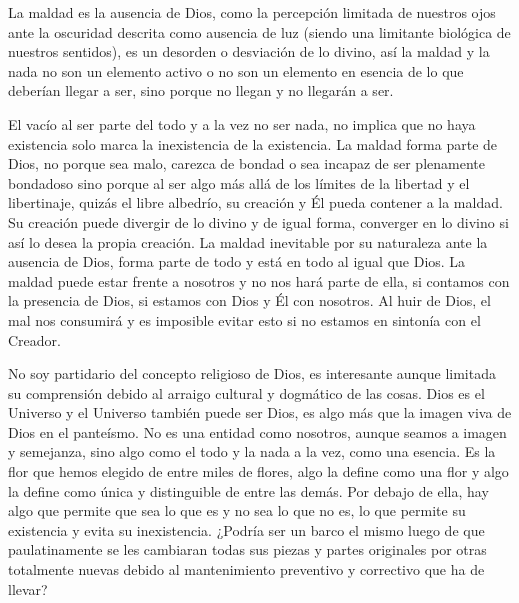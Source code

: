\documentclass[letterpaper,12pt]{article}
\begin{document}
La maldad es la ausencia de Dios, como la percepción limitada de nuestros ojos ante la oscuridad descrita como ausencia de luz (siendo una limitante biológica de nuestros sentidos), es un desorden o desviación de lo divino, así la maldad y la nada no son un elemento activo o no son un elemento en esencia de lo que deberían llegar a ser, sino porque no llegan y no llegarán a ser.

El vacío al ser parte del todo y a la vez no ser nada, no implica que no haya existencia solo marca la inexistencia de la existencia. La maldad forma parte de Dios, no porque sea malo, carezca de bondad o sea incapaz de ser plenamente bondadoso sino porque al ser algo más allá de los límites de la libertad y el libertinaje, quizás el libre albedrío, su creación y Él pueda contener a la maldad. Su creación puede divergir de lo divino y de igual forma, converger en lo divino si así lo desea la propia creación. La maldad inevitable por su naturaleza ante la ausencia de Dios, forma parte de todo y está en todo al igual que Dios. La maldad puede estar frente a nosotros y no nos hará parte de ella, si contamos con la presencia de Dios, si estamos con Dios y Él con nosotros. Al huir de Dios, el mal nos consumirá y es imposible evitar esto si no estamos en sintonía con el Creador.

No soy partidario del concepto religioso de Dios, es interesante aunque limitada su comprensión debido al arraigo cultural y dogmático de las cosas. Dios es el Universo y el Universo también puede ser Dios, es algo más que la imagen viva de Dios en el panteísmo. No es una entidad como nosotros, aunque seamos a imagen y semejanza, sino algo como el todo y la nada a la vez, como una esencia. Es la flor que hemos elegido de entre miles de flores, algo la define como una flor y algo la define como única y distinguible de entre las demás. Por debajo de ella, hay algo que permite que sea lo que es y no sea lo que no es, lo que permite su existencia y evita su inexistencia. ¿Podría ser un barco el mismo luego de que paulatinamente se les cambiaran todas sus piezas y partes originales por otras totalmente nuevas debido al mantenimiento preventivo y correctivo que ha de llevar?
\end{document}
